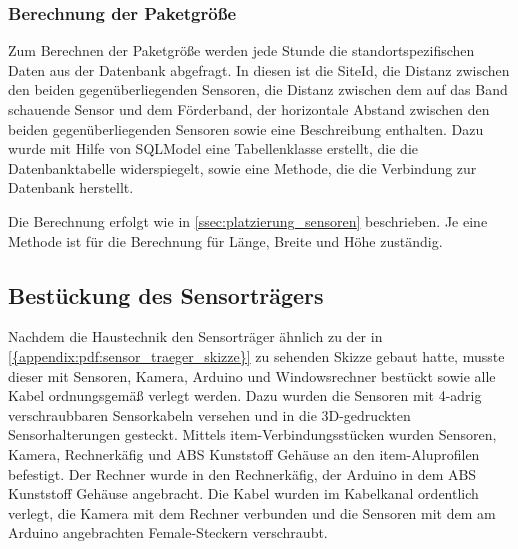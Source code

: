 \subsubsection{Berechnung der Paketgröße}

Zum Berechnen der Paketgröße werden jede Stunde die standortspezifischen Daten aus der Datenbank abgefragt. In diesen ist die SiteId, die Distanz zwischen den beiden gegenüberliegenden Sensoren, die Distanz zwischen dem auf das Band schauende Sensor und dem Förderband, der horizontale Abstand zwischen den beiden gegenüberliegenden Sensoren sowie eine Beschreibung enthalten. Dazu wurde mit Hilfe von SQLModel eine Tabellenklasse erstellt, die die Datenbanktabelle widerspiegelt, sowie eine Methode, die die Verbindung zur Datenbank herstellt.

Die Berechnung erfolgt wie in \vref{ssec:platzierung_sensoren} beschrieben. Je eine Methode ist für die Berechnung für Länge, Breite und Höhe zuständig.


\subsection{Bestückung des Sensorträgers}

Nachdem die Haustechnik den Sensorträger ähnlich zu der in \vref{{appendix:pdf:sensor_traeger_skizze}} zu sehenden Skizze gebaut hatte, musste dieser mit Sensoren, Kamera, Arduino und Windowsrechner bestückt sowie alle Kabel ordnungsgemäß verlegt werden. Dazu wurden die Sensoren mit 4-adrig verschraubbaren Sensorkabeln versehen und in die 3D-gedruckten Sensorhalterungen gesteckt. Mittels item-Verbindungsstücken wurden Sensoren, Kamera, Rechnerkäfig und ABS Kunststoff Gehäuse an den item-Aluprofilen befestigt. Der Rechner wurde in den Rechnerkäfig, der Arduino in dem ABS Kunststoff Gehäuse angebracht. Die Kabel wurden im Kabelkanal ordentlich verlegt, die Kamera mit dem Rechner verbunden und die Sensoren mit dem am Arduino angebrachten Female-Steckern verschraubt.
